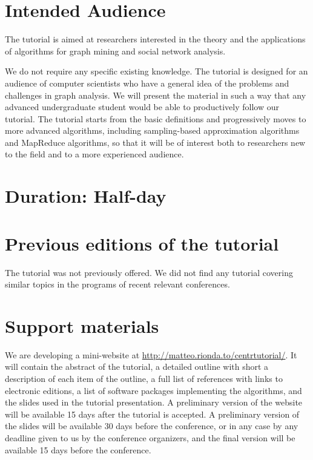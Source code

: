 \documentclass[pdfpagelabels=false]{sig-alternate-2013} %
\begin{document}
\section{Intended Audience}
The tutorial is aimed at researchers interested in the theory and the
applications of algorithms for graph mining and social network analysis.

We do not require any specific existing knowledge. The tutorial is designed for
an audience of computer scientists who have a general idea of the problems and
challenges in graph analysis. We will present the material in such a way that
any advanced undergraduate student would be able to productively follow our
tutorial. %
The tutorial starts from the basic definitions and progressively moves to more advanced
algorithms, including sampling-based approximation algorithms and MapReduce
algorithms, so that it will be of interest both to researchers new
to the field and to a more experienced audience.

\section{Duration: \textrm{Half-day}}

\section{Previous editions of the tutorial}
The tutorial was not previously offered. We did not find any tutorial covering
similar topics in the programs of recent relevant conferences.

\section{Support materials}
We are developing a mini-website at
\url{http://matteo.rionda.to/centrtutorial/}. It will contain the
abstract of the tutorial, a detailed outline with short a description of
each item of the outline, a full list of references with links to
electronic editions, a list of software packages implementing the
algorithms, and the slides used in the tutorial presentation. A preliminary version of the
website will be available 15 days after the tutorial is accepted. A preliminary
version of the slides will be available 30 days before the conference, or in any
case by any deadline given to us by the conference organizers, and the final
version will be available 15 days before the conference.



\end{document}
